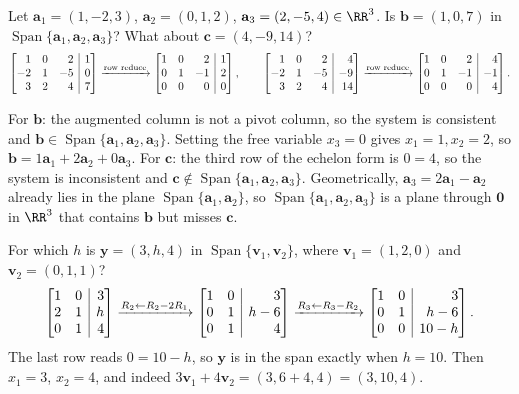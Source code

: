 \documentclass[10pt]{scrartcl}
\makeatletter
\newcommand{\aug}[2]{\left[\begin{array}{@{}#1@{}}#2\end{array}\right]}
\newcommand{\vv}[1]{\mathbf{#1}}
\DeclareMathOperator{\spn}{Span}
\makeatother
\begin{document}
\begin{example*}
Let $\vv a_1=(1,-2,3)$, $\vv a_2=(0,1,2)$, $\vv a_3=(2,-5,4)\in\RR^3$. Is $\vv b=(1,0,7)$ in $\spn\{\vv a_1,\vv a_2,\vv a_3\}$? What about $\vv c=(4,-9,14)$?
\[
  \aug{rrr|r}{1&0&2&1\\-2&1&-5&0\\3&2&4&7} \xrightarrow{\text{row reduce}} \aug{rrr|r}{1&0&2&1\\0&1&-1&2\\0&0&0&0},
  \qquad
  \aug{rrr|r}{1&0&2&4\\-2&1&-5&-9\\3&2&4&14} \xrightarrow{\text{row reduce}} \aug{rrr|r}{1&0&2&4\\0&1&-1&-1\\0&0&0&4}.
\]
\begin{steps}
  \ii For $\vv b$: the augmented column is not a pivot column, so the system is consistent and $\vv b\in\spn\{\vv a_1,\vv a_2,\vv a_3\}$. Setting the free variable $x_3=0$ gives $x_1=1,x_2=2$, so $\vv b=1\vv a_1+2\vv a_2+0\vv a_3$.
  \ii For $\vv c$: the third row of the echelon form is $0=4$, so the system is inconsistent and $\vv c\notin\spn\{\vv a_1,\vv a_2,\vv a_3\}$. Geometrically, $\vv a_3=2\vv a_1-\vv a_2$ already lies in the plane $\spn\{\vv a_1,\vv a_2\}$, so $\spn\{\vv a_1,\vv a_2,\vv a_3\}$ is a plane through $\vv 0$ in $\RR^3$ that contains $\vv b$ but misses $\vv c$.
\end{steps}
\end{example*}

\begin{example*}
For which $h$ is $\vv y=(3,h,4)$ in $\spn\{\vv v_1,\vv v_2\}$, where $\vv v_1=(1,2,0)$ and $\vv v_2=(0,1,1)$?
\[
  \aug{rr|r}{1&0&3\\2&1&h\\0&1&4}
  \xrightarrow{R_2\leftarrow R_2-2R_1}
  \aug{rr|r}{1&0&3\\0&1&h-6\\0&1&4}
  \xrightarrow{R_3\leftarrow R_3-R_2}
  \aug{rr|r}{1&0&3\\0&1&h-6\\0&0&10-h}.
\]
The last row reads $0=10-h$, so $\vv y$ is in the span exactly when $h=10$. Then $x_1=3$, $x_2=4$, and indeed $3\vv v_1+4\vv v_2=(3,6+4,4)=(3,10,4)$.
\end{example*}
\end{document}
